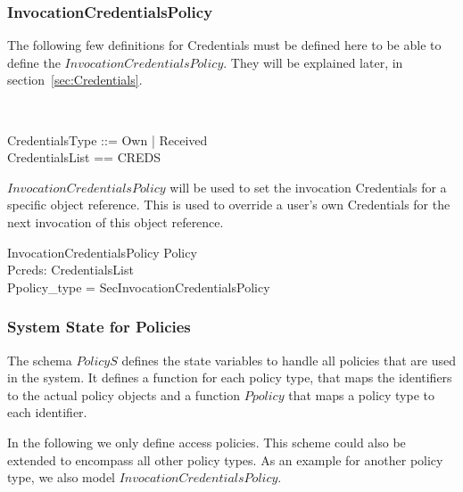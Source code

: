 \subsubsection{InvocationCredentialsPolicy}
The following few definitions for Credentials must be defined here to be able to
define the $InvocationCredentialsPolicy$.  They will be explained later, in
section~\ref{sec:Credentials}.
\begin{zedgroup}
  \begin{zed}
    [ CREDS ] \\
  \end{zed}
  \begin{zed}
    CredentialsType ::= Own | Received \\
    CredentialsList == \seq CREDS \\
  \end{zed}
\end{zedgroup}
$InvocationCredentialsPolicy$ will be used to set the invocation Credentials for
a specific object reference.  This is used to override a user's own Credentials
for the next invocation of this object reference.
\begin{schema}{InvocationCredentialsPolicy}
  Policy \\
  Pcreds: CredentialsList \\
  \where
  Ppolicy\_type = SecInvocationCredentialsPolicy \\
\end{schema}


\subsubsection{System State for Policies}
The schema $PolicyS$ defines the state variables to handle all policies that are
used in the system.  It defines a function for each policy type, that maps the
identifiers to the actual policy objects and a function $Ppolicy$ that maps a
policy type to each identifier.

In the following we only define access policies.  This scheme could also be
extended to encompass all other policy types.  As an example for another policy
type, we also model $InvocationCredentialsPolicy$.

